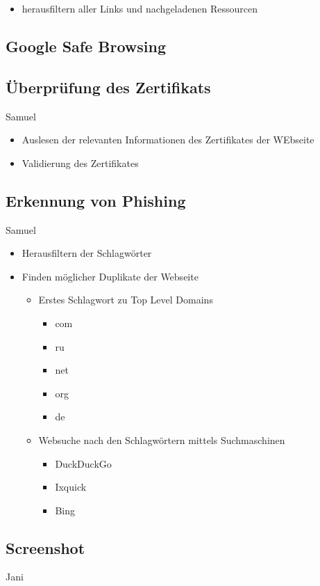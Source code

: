 
\begin{itemize}
  \item herausfiltern aller Links und nachgeladenen Ressourcen
\end{itemize}

\subsection{Google Safe Browsing}


\subsection{Überprüfung des Zertifikats}

\todo Samuel

\begin{itemize}
  \item Auslesen der relevanten Informationen des Zertifikates der WEbseite
  \item Validierung des Zertifikates
\end{itemize}

\subsection{Erkennung von Phishing}

\todo Samuel

\begin{itemize}
  \item Herausfiltern der Schlagwörter
  \item Finden möglicher Duplikate der Webseite
  \begin{itemize}
    \item Erstes Schlagwort zu Top Level Domains
    \begin{itemize}
      \item com
      \item ru
      \item net
      \item org
      \item de
    \end{itemize}
    \item Websuche nach den Schlagwörtern mittels Suchmaschinen
    \begin{itemize}
      \item DuckDuckGo
      \item Ixquick
      \item Bing
    \end{itemize}
  \end{itemize}
\end{itemize}

\subsection{Screenshot}

\todo Jani
